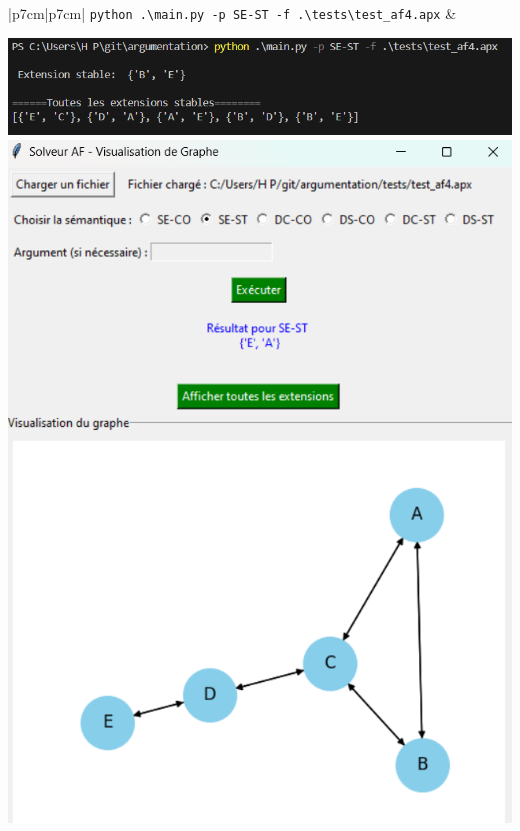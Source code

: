 \documentclass{rapportECL}
\begin{document}
\begin{longtable}{|p{7cm}|p{7cm}|}
	\texttt{python .\textbackslash main.py -p SE-ST -f .\textbackslash tests\textbackslash test\_af4.apx} & 
	\begin{minipage}{\linewidth}
		\centering
		\includegraphics[width=\linewidth]{img/c_consol.png} \\[0.2cm]
		\includegraphics[width=\linewidth]{img/c_ui.png}
	\end{minipage} \\[0.2cm] \\
	\caption{La commande pour lancer l'interface graphique est \texttt{python af\_visualizer.py}.}

	\end{longtable}
\end{document}
